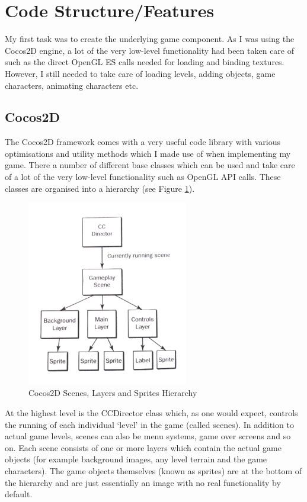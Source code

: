 \documentclass[a4paper,oneside]{report}
\begin{document}
\section{Code Structure/Features}

My first task was to create the underlying game component. As I was using the Cocos2D engine, a lot of the very low-level functionality had been taken care of such as the direct OpenGL ES calls needed for loading and binding textures. However, I still needed to take care of loading levels, adding objects, game characters, animating characters etc.

\subsection{Cocos2D} 

The Cocos2D framework comes with a very useful code library with various optimisations and utility methods which I made use of when implementing my game. There a number of different base classes which can be used and take care of a lot of the very low-level functionality such as OpenGL API calls. These classes are organised into a hierarchy (see Figure \ref{fig:Hierarchy}). 

\begin{figure}[h!]
  \centering
    \includegraphics[width=70mm]{sources/images/Cocos2DHierarchy}
    \caption{Cocos2D Scenes, Layers and Sprites Hierarchy \cite{Strougo:2011ys}}
    \label{fig:Hierarchy}
\end{figure}

At the highest level is the CCDirector class which, as one would expect, controls the running of each individual `level' in the game (called scenes). In addition to actual game levels, scenes can also be menu systems, game over screens and so on. Each scene consists of one or more layers which contain the actual game objects (for example background images, any level terrain and the game characters). The game objects themselves (known as sprites) are at the bottom of the hierarchy and are just essentially an image with no real functionality by default. 
\end{document}
